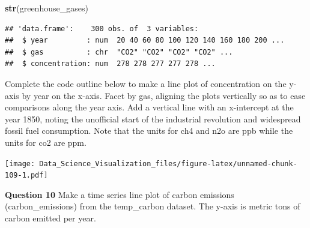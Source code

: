 \documentclass[
]{article}
\newenvironment{Shaded}{\begin{snugshade}}{\end{snugshade}}
\newcommand{\DataTypeTok}[1]{\textcolor[rgb]{0.13,0.29,0.53}{#1}}
\newcommand{\DecValTok}[1]{\textcolor[rgb]{0.00,0.00,0.81}{#1}}
\newcommand{\KeywordTok}[1]{\textcolor[rgb]{0.13,0.29,0.53}{\textbf{#1}}}
\newcommand{\NormalTok}[1]{#1}
\newcommand{\OperatorTok}[1]{\textcolor[rgb]{0.81,0.36,0.00}{\textbf{#1}}}
\newcommand{\StringTok}[1]{\textcolor[rgb]{0.31,0.60,0.02}{#1}}
\begin{document}
\begin{Shaded}
\begin{Highlighting}[]
\KeywordTok{str}\NormalTok{(greenhouse_gases)}
\end{Highlighting}
\end{Shaded}

\begin{verbatim}
## 'data.frame':    300 obs. of  3 variables:
##  $ year         : num  20 40 60 80 100 120 140 160 180 200 ...
##  $ gas          : chr  "CO2" "CO2" "CO2" "CO2" ...
##  $ concentration: num  278 278 277 277 278 ...
\end{verbatim}

Complete the code outline below to make a line plot of concentration on
the y-axis by year on the x-axis. Facet by gas, aligning the plots
vertically so as to ease comparisons along the year axis. Add a vertical
line with an x-intercept at the year 1850, noting the unofficial start
of the industrial revolution and widespread fossil fuel consumption.
Note that the units for ch4 and n2o are ppb while the units for co2 are
ppm.

\begin{Shaded}
\end{Shaded}

\texttt{[image: Data\_Science\_Visualization\_files/figure-latex/unnamed-chunk-109-1.pdf]}

\textbf{Question 10} Make a time series line plot of carbon emissions
(carbon\_emissions) from the temp\_carbon dataset. The y-axis is metric
tons of carbon emitted per year.
\end{document}
